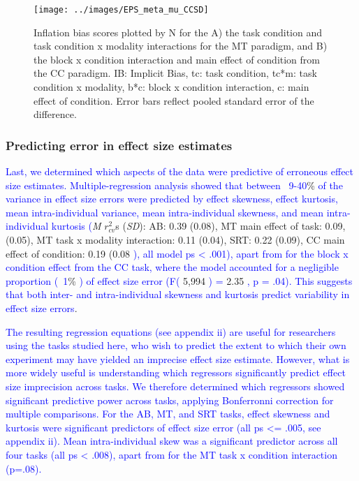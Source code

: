 \documentclass[
  man]{apa6}
\begin{document}
\begin{figure}

{\centering \texttt{[image: ../images/EPS\_meta\_mu\_CCSD]} 

}

\caption{Inflation bias scores plotted by N for the A) the task condition and task condition x modality interactions for the MT paradigm, and B) the block x condition interaction and main effect of condition from the CC paradigm. IB: Implicit Bias, tc: task condition, tc*m: task condition x modality, b*c: block x condition interaction, c: main effect of condition. Error bars reflect pooled standard error of the difference.}\label{fig:infbias}
\end{figure}

\hypertarget{predicting-error-in-effect-size-estimates}{%
\subsubsection{Predicting error in effect size estimates}\label{predicting-error-in-effect-size-estimates}}

\textcolor{blue}{Last, we determined which aspects of the data were predictive of erroneous effect size estimates. Multiple-regression analysis showed that between ~9-40}\% \textcolor{blue}{of the variance in effect size errors were predicted by effect skewness, effect kurtosis, mean intra-individual variance, mean intra-individual skewness, and mean intra-individual kurtosis (}\emph{M} \(r_{cv}^2\)s (\emph{SD}): AB: 0.39 (0.08), MT main effect of task: 0.09, (0.05), MT task x modality interaction: 0.11 (0.04), SRT: 0.22 (0.09), CC main effect of condition: 0.19 (0.08 \textcolor{blue}{), all model ps < .001), apart from for the block x condition effect from the CC task, where the model accounted for a negligible proportion (~1}\% \textcolor{blue}{) of effect size error (F(} 5,994 \textcolor{blue}{) =} 2.35 \textcolor{blue}{, p = .04). This suggests that both inter- and intra-individual skewness and kurtosis predict variability in effect size errors}.

\textcolor{blue}{The resulting regression equations (see appendix ii) are useful for researchers using the tasks studied here, who wish to predict the extent to which their own experiment may have yielded an imprecise effect size estimate. However, what is more widely useful is understanding which regressors significantly predict effect size imprecision across tasks. We therefore determined which regressors showed significant predictive power across tasks, applying Bonferronni correction for multiple comparisons. For the AB, MT, and SRT tasks, effect skewness and kurtosis were significant predictors of effect size error (all ps <= .005, see appendix ii). Mean intra-individual skew was a significant predictor across all four tasks (all ps < .008), apart from for the MT task x condition interaction (p=.08).}
\end{document}
